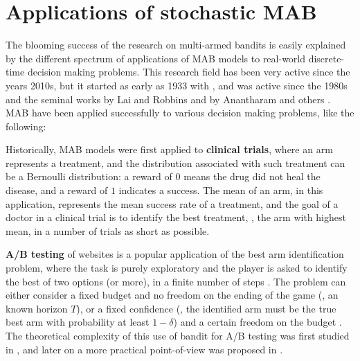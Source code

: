 \section{Applications of stochastic MAB}
\label{sec:2:applicationsofStochasticMAB}

The blooming success of the research on multi-armed bandits is easily explained by the different spectrum of applications of MAB models to real-world discrete-time decision making problems.
This research field has been very active since the years 2010s, but it started as early as 1933 with \cite{Thompson33}, and was active since the 1980s and the seminal works by Lai and Robbins \cite{LaiRobbins85} and by Anantharam and others \cite{Anantharam87a}.
%
MAB have been applied successfully to various decision making problems, like the following:

Historically, MAB models were first applied to \textbf{clinical trials}, where an arm represents a treatment, and the distribution associated with such treatment can be a Bernoulli distribution: a reward of $0$ means the drug did not heal the disease, and a reward of $1$ indicates a success. The mean of an arm, in this application, represents the mean success rate of a treatment, and the goal of a doctor in a clinical trial is to identify the best treatment, \ie, the arm with highest mean, in a number of trials as short as possible.
%

%
    \textbf{A/B testing} of websites is a popular application of the best arm identification problem,
    where the task is purely exploratory and the player is asked to identify the best of two options (or more), in a finite number of steps \cite{audibert2010best}.
    The problem can either consider a fixed budget and no freedom on the ending of the game (\ie, an known horizon $T$), or a fixed confidence (\ie, the identified arm must be the true best arm with probability at least $1-\delta$) and a certain freedom on the budget \cite{Garivier16BAI}.
    The theoretical complexity of this use of bandit for A/B testing was first studied in \cite{Kaufmann14},
    and later on a more practical point-of-view was proposed in \cite{Jamieson17ABTest}.

